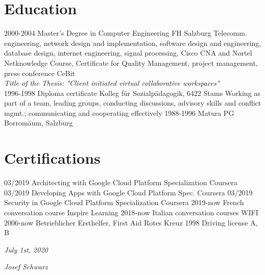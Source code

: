 \documentclass[]{friggeri-cv}
\begin{document}
\section{Education}
\begin{entrylist}
  \entry
    {2000-2004}
    {Master's Degree in Computer Engineering}
    {FH Salzburg}
    {Telecomm. engineering, network design and implementation, software design and engineering, database design, internet engineering, signal processing, 
Cisco CNA and Nortel Netknowledge Course, Certificate for Quality Management, project management, press conference CeBit\\
    \emph{Title of the Thesis: "Client initiated virtual collaborative workspaces"}\\}
  \entry
    {1996-1998}
    {Diploma certificate}
    {Kolleg für Sozialpädagogik, 6422 Stams}
    {Working as part of a team, leading groups, conducting discussions, advisory skills and conflict mgmt.; communicating and cooperating effectively}
  \entry
    {1988-1996}
    {Matura}
    {PG Borromäum, Salzburg}
    {}
\end{entrylist}

\section{Certifications}
\begin{entrylist}
  \entry
    {03/2019}
    {Architecting with Google Cloud Platform Specialization}
    {Coursera}
    {}
  \entry
    {03/2019}
    {Developing Apps with Google Cloud Platform Spec.}
    {Coursera}
    {}
  \entry
    {03/2019}
    {Security in Google Cloud Platform Specialization}
    {Coursera}
    {}
  \entry
    {2019-now}
    {French conversation course}
    {Inspire Learning}
    {}
  \entry
    {2018-now}
    {Italian conversation courses}
    {WIFI}
    {}
  \entry
    {2006-now}
    {Betrieblicher Ersthelfer, First Aid}
    {Rotes Kreuz}
    {}
  \entry
    {1998}
    {Driving license A, B}
    {}
    {}
\end{entrylist}

\begin{flushleft}
\emph{July 1st, 2020}
\end{flushleft}
\begin{flushright}
\emph{Josef Schwarz}
\end{flushright}
\end{document}
